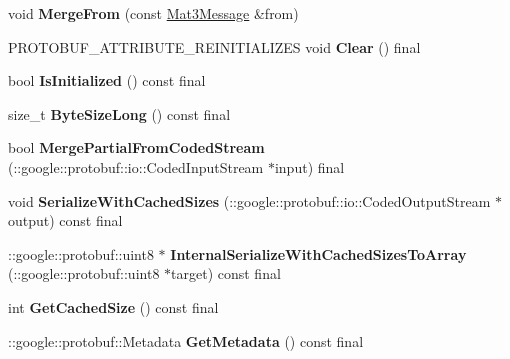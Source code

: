 \begin{DoxyCompactItemize}
\item 
\mbox{\label{classtbMath_1_1Mat3Message_abe068a1de11b278fa5ff65b5b81916ce}} 
void {\bfseries Merge\+From} (const \hyperlink{classtbMath_1_1Mat3Message}{Mat3\+Message} \&from)
\item 
\mbox{\label{classtbMath_1_1Mat3Message_ad30cf91e0b09a30055fececbe80fd4b7}} 
P\+R\+O\+T\+O\+B\+U\+F\+\_\+\+A\+T\+T\+R\+I\+B\+U\+T\+E\+\_\+\+R\+E\+I\+N\+I\+T\+I\+A\+L\+I\+Z\+ES void {\bfseries Clear} () final
\item 
\mbox{\label{classtbMath_1_1Mat3Message_af0d63964c463b5e648968f4e25bbc961}} 
bool {\bfseries Is\+Initialized} () const final
\item 
\mbox{\label{classtbMath_1_1Mat3Message_a187576d800b36b11bbe97b0c88ca8bed}} 
size\+\_\+t {\bfseries Byte\+Size\+Long} () const final
\item 
\mbox{\label{classtbMath_1_1Mat3Message_a8995784b79aecb0689c206d63c2100d1}} 
bool {\bfseries Merge\+Partial\+From\+Coded\+Stream} (\+::google\+::protobuf\+::io\+::\+Coded\+Input\+Stream $\ast$input) final
\item 
\mbox{\label{classtbMath_1_1Mat3Message_ab349d5b1b17982e3ac4d7921f06d7680}} 
void {\bfseries Serialize\+With\+Cached\+Sizes} (\+::google\+::protobuf\+::io\+::\+Coded\+Output\+Stream $\ast$output) const final
\item 
\mbox{\label{classtbMath_1_1Mat3Message_a21da7f4dac7a5578b00af7cc57b7e8f8}} 
\+::google\+::protobuf\+::uint8 $\ast$ {\bfseries Internal\+Serialize\+With\+Cached\+Sizes\+To\+Array} (\+::google\+::protobuf\+::uint8 $\ast$target) const final
\item 
\mbox{\label{classtbMath_1_1Mat3Message_ac629326573aabce8ad84ecec96607c52}} 
int {\bfseries Get\+Cached\+Size} () const final
\item 
\mbox{\label{classtbMath_1_1Mat3Message_ab0d4f725a216db91c924a42462eb46a6}} 
\+::google\+::protobuf\+::\+Metadata {\bfseries Get\+Metadata} () const final

\end{DoxyCompactItemize}
